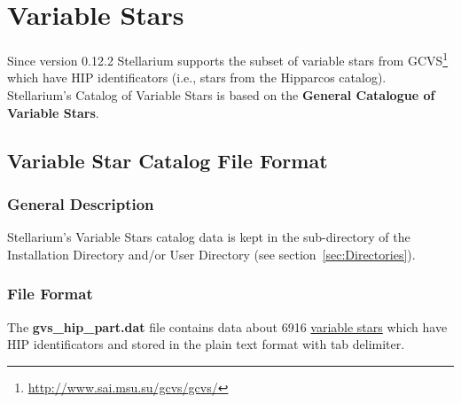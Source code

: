 \section{Variable Stars}
\label{sec:StarCatalogues:VariableStars}

Since version 0.12.2 Stellarium supports the subset of variable stars
from GCVS\footnote{\url{http://www.sai.msu.su/gcvs/gcvs/}} which have  HIP
identificators (i.e., stars from the Hipparcos catalog). Stellarium's Catalog
of Variable Stars is based on the
\textbf{General Catalogue of Variable Stars}\cite{samus}.

\subsection{Variable Star Catalog File Format}
\label{sec:StarCatalogues:VariableStars:format}

\subsubsection{General Description}%
\label{sec:StarCatalogues:VariableStars:general}

Stellarium's Variable Stars catalog data is kept
in the  sub-directory of the Installation Directory and/or
User Directory (see section~\ref{sec:Directories}).


\subsubsection{File Format}%
\label{sec:StarCatalogues:VariableStars:file}

The \textbf{gvs\_hip\_part.dat} file contains data about 6916
\href{Variable_Stars}{variable stars} which have HIP identificators and
stored in the plain text format with tab delimiter.

